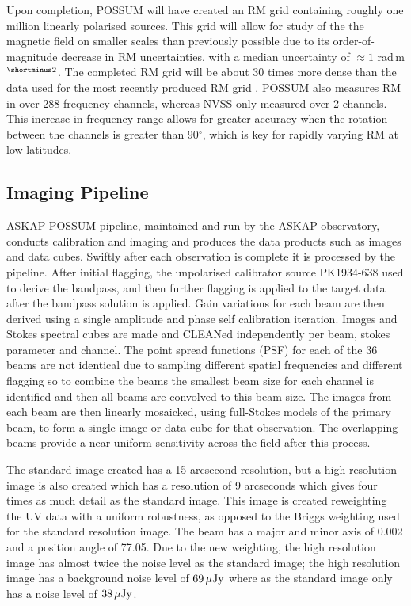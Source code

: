 Upon completion, POSSUM will have created an RM grid containing roughly one million linearly polarised sources. This grid will allow for study of the the magnetic field on smaller scales than previously possible due to its order-of-magnitude decrease in RM uncertainties, with a median uncertainty of $\approx 1$ rad$\,$m$^{\shortminus2}$. The completed RM grid will be about 30 times more dense than the data used for the most recently produced RM grid \cite{Hutschenreuter_2020}. POSSUM also measures RM in over 288 frequency channels, whereas NVSS only measured over 2 channels. This increase in frequency range allows for greater accuracy when the rotation between the channels is greater than 90$^\circ$, which is key for rapidly varying RM at low latitudes.

\subsection{Imaging Pipeline}


ASKAP-POSSUM pipeline, maintained and run by the ASKAP observatory, conducts calibration and imaging and produces the data products such as images and data cubes. Swiftly after each observation is complete it is processed by the pipeline. After initial flagging, the unpolarised calibrator source PK1934-638 used to derive the bandpass, and then further flagging is applied to the target data after the bandpass solution is applied. Gain variations for each beam are then derived using a single amplitude and phase self calibration iteration. Images and Stokes spectral cubes are made and CLEANed independently per beam, stokes parameter and channel. The point spread functions (PSF) for each of the 36 beams are not identical due to sampling different spatial frequencies and different flagging so to combine the beams the smallest beam size for each channel is identified and then all beams are convolved to this beam size. The images from each beam are then linearly mosaicked, using full-Stokes models of the primary beam, to form a single image or data cube for that observation. The overlapping beams provide a near-uniform sensitivity across the field after this process. 

The standard image created has a 15 arcsecond resolution, but a high resolution image is also created which has a resolution of 9 arcseconds which gives four times as much detail as the standard image. This image is created reweighting the UV data with a uniform robustness, as opposed to the Briggs weighting used for the standard resolution image. The beam has a major and minor axis of 0.002 and a position angle of 77.05. Due to the new weighting, the high resolution image has almost twice the noise level as the standard image;  the high resolution image has a background noise level of $69 {\rm\, \mu Jy}$ where as the standard image only has a noise level of $38 {\rm\, \mu Jy}$.

